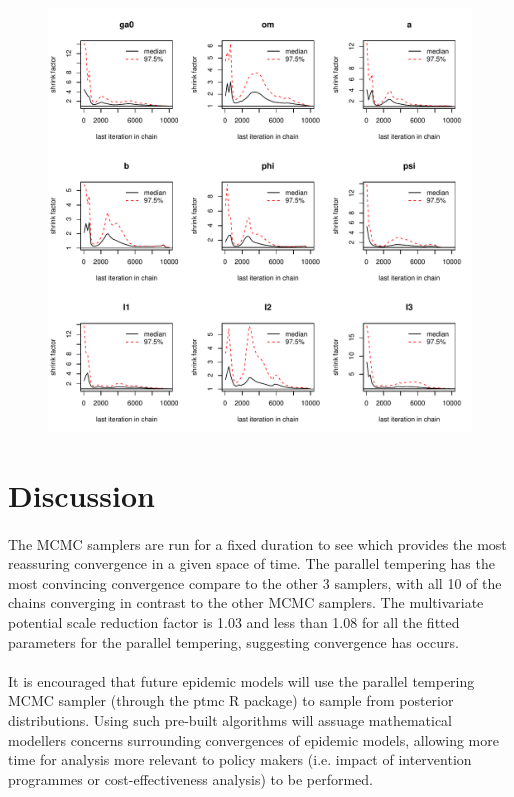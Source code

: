 \documentclass[10pt,twoside]{report} %
\begin{document}
\begin{figure}[h] %
\centering
    \includegraphics[width=1.0\textwidth]{../figs/convPT.pdf}
  \caption{\label{fig:5}}  
\end{figure}


\section{Discussion}
\paragraph{}The MCMC samplers are run for a fixed duration to see which provides the most reassuring convergence in a given space of time. The parallel tempering has the most convincing convergence compare to the other 3 samplers, with all 10 of the chains converging in contrast to the other MCMC samplers. The multivariate potential scale reduction factor is 1.03 and less than 1.08 for all the fitted parameters for the parallel tempering, suggesting convergence has occurs. 

\paragraph{}It is encouraged that future epidemic models will use the parallel tempering MCMC sampler (through the ptmc R package) to sample from posterior distributions. Using such pre-built algorithms will assuage mathematical modellers concerns surrounding convergences of epidemic models, allowing more time for analysis more relevant to policy makers (i.e. impact of intervention programmes or cost-effectiveness analysis) to be performed. 
\end{document}
